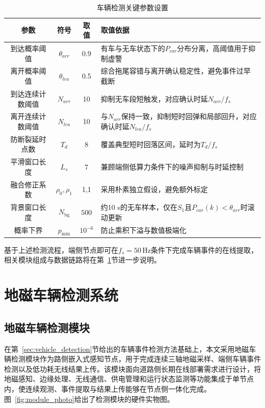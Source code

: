 \documentclass{xdupgthesis}
\makeatletter
\newcommand{\Fs}{\ensuremath{50\,\mathrm{Hz}}}
\newcommand{\SmoothLen}{\ensuremath{7}}        %
\newcommand{\BgWinPts}{\ensuremath{500}}       %
\newcommand{\ProbFloor}{\ensuremath{10^{-6}}}  %
\providecommand{\FloatBarrier}{}
\makeatother
\begin{document}
\begin{table}[!htbp]
    \centering
    \caption{车辆检测关键参数设置}
    \label{tab:det_param}
    \begin{tabular}{c c c C{6.4cm}}
        \toprule
        参数 & 符号 & 取值 & 取值依据 \\
        \midrule
        到达概率阈值 & $\theta_{arr}$ & 0.9 & 有车与无车状态下的$P_{car}$分布分离，高阈值用于抑制虚警 \\
        离开概率阈值 & $\theta_{lea}$ & 0.5 & 综合拖尾容错与离开确认稳定性，避免事件过早截断 \\
        到达连续计数阈值 & $N_{arr}$ & 10 & 抑制无车段短触发，对应确认时延$N_{arr}/f_s$ \\
        离开连续计数阈值 & $N_{lea}$ & 10 & 与$N_{arr}$保持一致，抑制短时回弹和局部回升，对应确认时延$N_{lea}/f_s$ \\
        防断裂延时点数 & $T_d$ & 8 & 覆盖典型短时回落区间，延时为$T_d/f_s$ \\
        \addlinespace[2pt]
        平滑窗口长度 & $L_s$ & \SmoothLen & 兼顾端侧低算力条件下的噪声抑制与时延控制 \\
        融合修正系数 & $\rho_0,\rho_1$ & 1,1 & 采用朴素独立假设，避免额外标定 \\
        背景窗口长度 & $N_{\mathrm{bg}}$ & \BgWinPts & 约10 s的无车样本，仅在$S_1$且$P_{car}(k)<\theta_{arr}$时滚动更新 \\
        概率下界 & $p_{\min}$ & \ProbFloor & 防止乘积下溢与数值极端化 \\
        \bottomrule
    \end{tabular}
\end{table}

基于上述检测流程，端侧节点即可在$f_s=\Fs$条件下完成车辆事件的在线提取，相关模块组成与数据链路将在第~\ref{sec:ch2_system}节进一步说明。

\FloatBarrier

\section{地磁车辆检测系统}
\label{sec:ch2_system}

\subsection{地磁车辆检测模块}
\label{sec:ch2_module}

在第~\ref{sec:vehicle_detection}节给出的车辆事件检测方法基础上，本文采用地磁车辆检测模块作为路侧嵌入式感知节点，用于完成连续三轴地磁采样、端侧车辆事件检测以及低功耗无线结果上传。该模块面向道路侧长期在线部署需求进行设计，将地磁感知、边缘处理、无线通信、供电管理和运行状态监测等功能集成于单节点内，使连续观测、事件提取与结果上传能够在节点侧一体化完成。图~\ref{fig:module_photo}给出了检测模块的硬件实物图。
\end{document}
